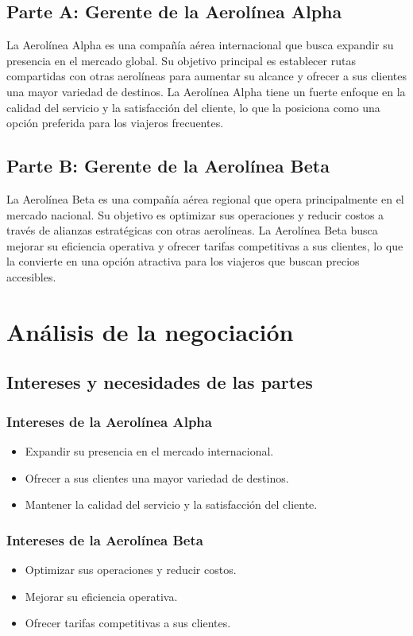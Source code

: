 \subsection{Parte A: Gerente de la Aerolínea Alpha}
La Aerolínea Alpha es una compañía aérea internacional que busca expandir su presencia en el mercado global. Su objetivo principal es establecer rutas compartidas con otras aerolíneas para aumentar su alcance y ofrecer a sus clientes una mayor variedad de destinos. La Aerolínea Alpha tiene un fuerte enfoque en la calidad del servicio y la satisfacción del cliente, lo que la posiciona como una opción preferida para los viajeros frecuentes.

\subsection{Parte B: Gerente de la Aerolínea Beta}
La Aerolínea Beta es una compañía aérea regional que opera principalmente en el mercado nacional. Su objetivo es optimizar sus operaciones y reducir costos a través de alianzas estratégicas con otras aerolíneas. La Aerolínea Beta busca mejorar su eficiencia operativa y ofrecer tarifas competitivas a sus clientes, lo que la convierte en una opción atractiva para los viajeros que buscan precios accesibles.

\section{Análisis de la negociación}
\subsection{Intereses y necesidades de las partes}
\subsubsection{Intereses de la Aerolínea Alpha}
\begin{itemize}
    \item Expandir su presencia en el mercado internacional.
    \item Ofrecer a sus clientes una mayor variedad de destinos.
    \item Mantener la calidad del servicio y la satisfacción del cliente.
\end{itemize}
\subsubsection{Intereses de la Aerolínea Beta}
\begin{itemize}
    \item Optimizar sus operaciones y reducir costos.
    \item Mejorar su eficiencia operativa.
    \item Ofrecer tarifas competitivas a sus clientes.
\end{itemize}


